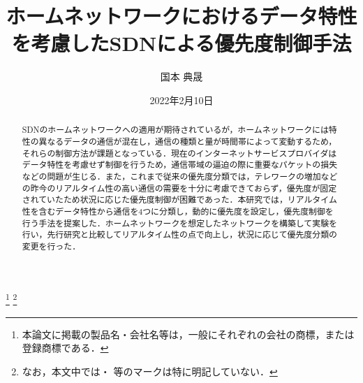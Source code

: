 \documentclass[a4paper,11pt,uplatex]{ujreport}
\title{ホームネットワークにおけるデータ特性を考慮したSDNによる優先度制御手法}  %
\author{国本 典晟}  %
\date{2022年2月10日}  %
\begin{document}
\maketitle
\clearpage

\begin{abstract}

  SDNのホームネットワークへの適用が期待されているが，ホームネットワークには特性の異なるデータの通信が混在し，通信の種類と量が時間帯によって変動するため，それらの制御方法が課題となっている．現在のインターネットサービスプロバイダはデータ特性を考慮せず制御を行うため，通信帯域の逼迫の際に重要なパケットの損失などの問題が生じる．また，これまで従来の優先度分類では，テレワークの増加などの昨今のリアルタイム性の高い通信の需要を十分に考慮できておらず，優先度が固定されていたため状況に応じた優先度制御が困難であった．本研究では，リアルタイム性を含むデータ特性から通信を4つに分類し，動的に優先度を設定し，優先度制御を行う手法を提案した．ホームネットワークを想定したネットワークを構築して実験を行い，先行研究と比較してリアルタイム性の点で向上し，状況に応じて優先度分類の変更を行った．

\end{abstract}


\footnote[0]{本論文に掲載の製品名・会社名等は，一般にそれぞれの会社の商標，または登録商標である．}
\footnote[0]{なお，本文中では\texttrademark ・ \textregistered 等のマークは特に明記していない．}

\end{document}
